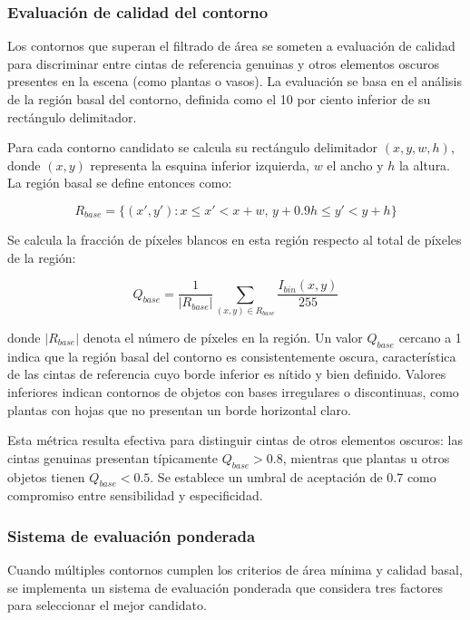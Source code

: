\subsubsection{Evaluación de calidad del contorno}

Los contornos que superan el filtrado de área se someten a evaluación de calidad para discriminar entre cintas de referencia genuinas y otros elementos oscuros presentes en la escena (como plantas o vasos). La evaluación se basa en el análisis de la región basal del contorno, definida como el 10 por ciento inferior de su rectángulo delimitador.

Para cada contorno candidato se calcula su rectángulo delimitador $(x, y, w, h)$, donde $(x,y)$ representa la esquina inferior izquierda, $w$ el ancho y $h$ la altura. La región basal se define entonces como:

\begin{equation}
R_{base} = \{(x',y') : x \leq x' < x+w, \, y+0.9h \leq y' < y+h\}
\end{equation}

Se calcula la fracción de píxeles blancos en esta región respecto al total de píxeles de la región:

\begin{equation}
Q_{base} = \frac{1}{|R_{base}|} \sum_{(x,y) \in R_{base}} \frac{I_{bin}(x,y)}{255}
\end{equation}

donde $|R_{base}|$ denota el número de píxeles en la región. Un valor $Q_{base}$ cercano a 1 indica que la región basal del contorno es consistentemente oscura, característica de las cintas de referencia cuyo borde inferior es nítido y bien definido. Valores inferiores indican contornos de objetos con bases irregulares o discontinuas, como plantas con hojas que no presentan un borde horizontal claro.

Esta métrica resulta efectiva para distinguir cintas de otros elementos oscuros: las cintas genuinas presentan típicamente $Q_{base} > 0.8$, mientras que plantas u otros objetos tienen $Q_{base} < 0.5$. Se establece un umbral de aceptación de 0.7 como compromiso entre sensibilidad y especificidad.

\subsubsection{Sistema de evaluación ponderada}

Cuando múltiples contornos cumplen los criterios de área mínima y calidad basal, se implementa un sistema de evaluación ponderada que considera tres factores para seleccionar el mejor candidato.


